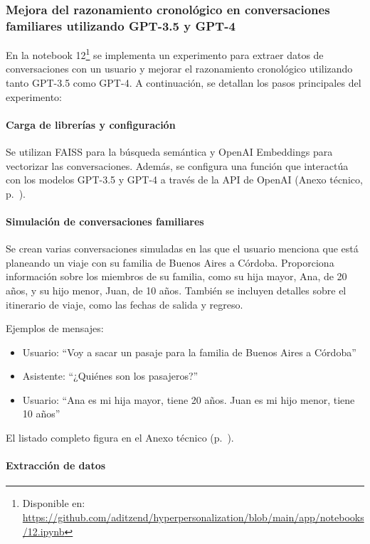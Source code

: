 \subsubsection{Mejora del razonamiento cronológico en conversaciones familiares utilizando GPT-3.5 y GPT-4}

En la notebook 12\footnote{Disponible en: \url{https://github.com/aditzend/hyperpersonalization/blob/main/app/notebooks/12.ipynb}} se implementa un experimento para extraer datos de conversaciones con un usuario y mejorar el razonamiento cronológico utilizando tanto GPT-3.5 como GPT-4. A continuación, se detallan los pasos principales del experimento:

\paragraph{Carga de librerías y configuración}

Se utilizan FAISS para la búsqueda semántica y OpenAI Embeddings para vectorizar las conversaciones. Además, se configura una función que interactúa con los modelos GPT-3.5 y GPT-4 a través de la API de OpenAI (Anexo técnico, p.~\pageref{anexo:code-4-1-12-1}).

\paragraph{Simulación de conversaciones familiares}

Se crean varias conversaciones simuladas en las que el usuario menciona que está planeando un viaje con su familia de Buenos Aires a Córdoba. Proporciona información sobre los miembros de su familia, como su hija mayor, Ana, de 20 años, y su hijo menor, Juan, de 10 años. También se incluyen detalles sobre el itinerario de viaje, como las fechas de salida y regreso.

Ejemplos de mensajes:
\begin{itemize}
    \item Usuario: ``Voy a sacar un pasaje para la familia de Buenos Aires a Córdoba''
    \item Asistente: ``¿Quiénes son los pasajeros?''
    \item Usuario: ``Ana es mi hija mayor, tiene 20 años. Juan es mi hijo menor, tiene 10 años''
\end{itemize}

El listado completo figura en el Anexo técnico (p.~\pageref{anexo:code-4-1-12-2}).

\paragraph{Extracción de datos}

